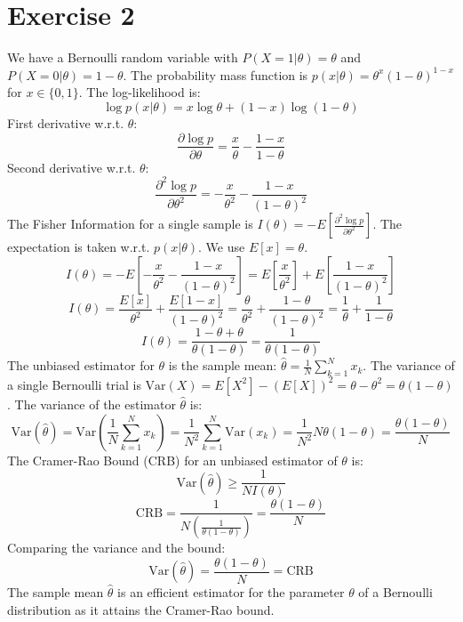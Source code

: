 \documentclass{article}
\begin{document}
\section*{Exercise 2}

We have a Bernoulli random variable with $P(X=1|\theta) = \theta$ and $P(X=0|\theta) = 1-\theta$.
The probability mass function is $p(x|\theta) = \theta^x (1-\theta)^{1-x}$ for $x \in \{0, 1\}$.
The log-likelihood is:
\[
\log p(x|\theta) = x \log \theta + (1-x) \log(1-\theta)
\]
First derivative w.r.t. $\theta$:
\[
\frac{\partial \log p}{\partial \theta} = \frac{x}{\theta} - \frac{1-x}{1-\theta}
\]
Second derivative w.r.t. $\theta$:
\[
\frac{\partial^2 \log p}{\partial \theta^2} = -\frac{x}{\theta^2} - \frac{1-x}{(1-\theta)^2}
\]
The Fisher Information for a single sample is $I(\theta) = -E\left[\frac{\partial^2 \log p}{\partial \theta^2}\right]$.
The expectation is taken w.r.t. $p(x|\theta)$. We use $E[x] = \theta$.
\[
I(\theta) = -E\left[ -\frac{x}{\theta^2} - \frac{1-x}{(1-\theta)^2} \right] = E\left[ \frac{x}{\theta^2} \right] + E\left[ \frac{1-x}{(1-\theta)^2} \right]
\]
\[
I(\theta) = \frac{E[x]}{\theta^2} + \frac{E[1-x]}{(1-\theta)^2} = \frac{\theta}{\theta^2} + \frac{1-\theta}{(1-\theta)^2} = \frac{1}{\theta} + \frac{1}{1-\theta}
\]
\[
I(\theta) = \frac{1-\theta + \theta}{\theta(1-\theta)} = \frac{1}{\theta(1-\theta)}
\]
The unbiased estimator for $\theta$ is the sample mean: $\hat{\theta} = \frac{1}{N} \sum_{k=1}^N x_k$.
The variance of a single Bernoulli trial is $\text{Var}(X) = E[X^2] - (E[X])^2 = \theta - \theta^2 = \theta(1-\theta)$.
The variance of the estimator $\hat{\theta}$ is:
\[
\text{Var}(\hat{\theta}) = \text{Var}\left(\frac{1}{N} \sum_{k=1}^N x_k\right) = \frac{1}{N^2} \sum_{k=1}^N \text{Var}(x_k) = \frac{1}{N^2} N \theta(1-\theta) = \frac{\theta(1-\theta)}{N}
\]
The Cramer-Rao Bound (CRB) for an unbiased estimator of $\theta$ is:
\[
\text{Var}(\hat{\theta}) \ge \frac{1}{N I(\theta)}
\]
\[
\text{CRB} = \frac{1}{N \left(\frac{1}{\theta(1-\theta)}\right)} = \frac{\theta(1-\theta)}{N}
\]
Comparing the variance and the bound:
\[
\text{Var}(\hat{\theta}) = \frac{\theta(1-\theta)}{N} = \text{CRB}
\]
The sample mean $\hat{\theta}$ is an efficient estimator for the parameter $\theta$ of a Bernoulli distribution as it attains the Cramer-Rao bound.
\end{document}
